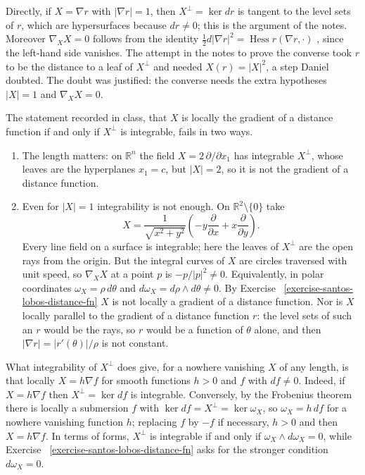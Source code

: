 \noindent
Directly, if $X = \nabla r$ with
$|\nabla r| = 1$, then $X^\perp = \ker dr$
is tangent to the level sets of $r$, which
are hypersurfaces because $dr \neq 0$; this
is the argument of the notes. Moreover
$\nabla_X X = 0$ follows from the identity
$\frac{1}{2} d|\nabla r|^2 =
\operatorname{Hess} r(\nabla r, \cdot)$
\cite[(2.26)]{gomes2015operadores}, since
the left-hand side vanishes. The attempt in
the notes to prove the converse took $r$ to
be the distance to a leaf of $X^\perp$ and
needed $X(r) = |X|^2$, a step Daniel
doubted. The doubt was justified: the
converse needs the extra hypotheses
$|X| = 1$ and $\nabla_X X = 0$.

\begin{remark}
\label{remark-santos-lobos-distance-false}
The statement recorded in class, that $X$
is locally the gradient of a distance
function if and only if $X^\perp$ is
integrable, fails in two ways.
\begin{enumerate}
\item The length matters: on
$\mathbb{R}^n$ the field
$X = 2\,\partial/\partial x_1$ has
integrable $X^\perp$, whose leaves are the
hyperplanes $x_1 = c$, but $|X| = 2$, so it
is not the gradient of a distance function.
\item Even for $|X| = 1$ integrability is
not enough. On $\mathbb{R}^2 \setminus
\{0\}$ take
$$
X = \frac{1}{\sqrt{x^2 + y^2}}
\left(-y \frac{\partial}{\partial x}
+ x \frac{\partial}{\partial y}\right).
$$
Every line field on a surface is
integrable; here the leaves of $X^\perp$
are the open rays from the origin. But the
integral curves of $X$ are circles
traversed with unit speed, so
$\nabla_X X$ at a point $p$ is
$-p/|p|^2 \neq 0$. Equivalently, in polar
coordinates $\omega_X = \rho\, d\theta$ and
$d\omega_X = d\rho \wedge d\theta \neq 0$.
By Exercise~%
\ref{exercise-santos-lobos-distance-fn}
$X$ is not locally a gradient of a distance
function. Nor is $X$ locally parallel to
the gradient of a distance function $r$:
the level sets of such an $r$ would be the
rays, so $r$ would be a function of
$\theta$ alone, and then
$|\nabla r| = |r'(\theta)|/\rho$ is not
constant.
\end{enumerate}
\end{remark}

\begin{remark}
\label{remark-santos-lobos-frobenius-form}
What integrability of $X^\perp$ does give,
for a nowhere vanishing $X$ of any length,
is that locally $X = h \nabla f$ for smooth
functions $h > 0$ and $f$ with
$df \neq 0$. Indeed, if $X = h\nabla f$ then
$X^\perp = \ker df$ is integrable.
Conversely, by the Frobenius theorem there
is locally a submersion $f$ with
$\ker df = X^\perp = \ker \omega_X$, so
$\omega_X = h\, df$ for a nowhere vanishing
function $h$; replacing $f$ by $-f$ if
necessary, $h > 0$ and then
$X = h \nabla f$. In terms of forms,
$X^\perp$ is integrable if and only if
$\omega_X \wedge d\omega_X = 0$, while
Exercise~%
\ref{exercise-santos-lobos-distance-fn}
asks for the stronger condition
$d\omega_X = 0$.
\end{remark}

